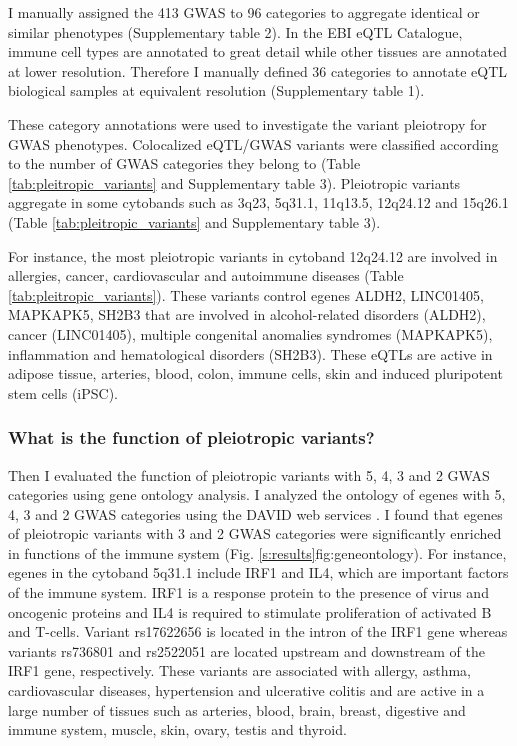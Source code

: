 I manually assigned the 413 GWAS to 96 categories to aggregate identical or similar phenotypes (Supplementary table 2).
%
In the EBI eQTL Catalogue, immune cell types are annotated to great detail while other tissues are annotated at lower resolution.
%
Therefore I manually defined 36 categories to annotate eQTL biological samples at equivalent resolution (Supplementary table 1).

These category annotations were used to investigate the variant pleiotropy for GWAS phenotypes.
%
Colocalized eQTL/GWAS variants were classified according to the number of GWAS categories they belong to (Table \ref{tab:pleitropic_variants} and Supplementary table 3).
%
Pleiotropic variants aggregate in some cytobands such as 3q23, 5q31.1, 11q13.5, 12q24.12 and 15q26.1 (Table \ref{tab:pleitropic_variants} and Supplementary table 3).

For instance, the most pleiotropic variants in cytoband 12q24.12 are involved in allergies, cancer, cardiovascular and autoimmune diseases (Table \ref{tab:pleitropic_variants}).
%
These variants control egenes ALDH2, LINC01405, MAPKAPK5, SH2B3 that are involved in alcohol-related disorders (ALDH2), cancer (LINC01405), multiple congenital anomalies syndromes (MAPKAPK5),  inflammation and hematological disorders (SH2B3).
%
These eQTLs are active in adipose tissue, arteries, blood, colon, immune cells, skin and induced pluripotent stem cells (iPSC).

\subsubsection*{What is the function of pleiotropic variants?}

Then I evaluated the function of pleiotropic variants with 5, 4, 3 and 2 GWAS categories using gene ontology analysis.
%
I analyzed the ontology of egenes with 5, 4, 3 and 2 GWAS categories using the DAVID web services \citep{2008.Lempicki.Huang,2008.Lempicki.Huang.NucleicAcidsResearch}.
%
I found that egenes of pleiotropic variants with 3 and 2 GWAS categories were significantly enriched in functions of the immune system (Fig. \ref{s:results}{fig:geneontology}).
For instance, egenes in the cytoband 5q31.1 include IRF1 and IL4, which are important factors of the immune system.
%
IRF1 is a response protein to the presence of virus and oncogenic proteins and IL4 is required to stimulate proliferation of activated B and T-cells.
%
Variant rs17622656 is located in the intron of the IRF1 gene whereas variants rs736801 and rs2522051 are located upstream and downstream of the IRF1 gene, respectively.
%
These variants are associated with allergy, asthma, cardiovascular diseases, hypertension and ulcerative colitis and are active in a large number of tissues such as arteries, blood, brain, breast, digestive and immune system, muscle, skin, ovary, testis and thyroid.

